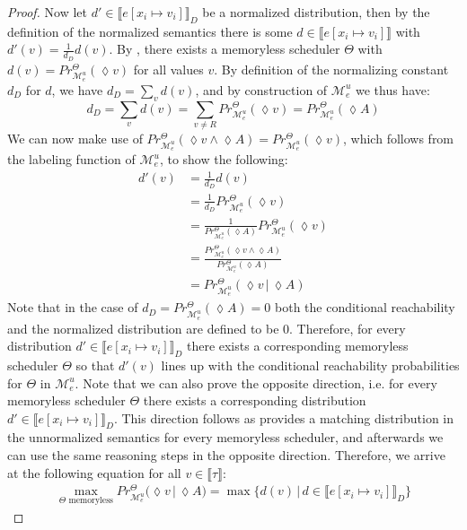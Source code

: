\begin{proof}
	Now let $d' \in \llbracket e[x_i\mapsto v_i] \rrbracket_D$ be a normalized distribution, then by the definition of the normalized semantics there is some $d \in \llbracket e[x_i\mapsto v_i] \rrbracket$ with $d'(v) = \frac{1}{d_D} d(v)$.
	By , there exists a memoryless scheduler $\Theta$ with $d(v) = Pr^\Theta_{\mathcal{M}^u_e}(\lozenge v)$ for all values $v$.
	By definition of the normalizing constant $d_D$ for $d$, we have $d_D = \sum_{v} d(v)$, and by construction of $\mathcal{M}^u_e$ we thus have:
	$$d_D = \sum_{v} d(v) = \sum_{v \neq R} Pr^\Theta_{\mathcal{M}^u_e}(\lozenge v) = Pr^\Theta_{\mathcal{M}^u_e}(\lozenge A)$$
	We can now make use of $Pr^\Theta_{\mathcal{M}^u_e}(\lozenge v \land \lozenge A) = Pr^\Theta_{\mathcal{M}^u_e}(\lozenge v)$, which follows from the labeling function of $\mathcal{M}^u_e$, to show the following:
	\begin{align*}
		d' (v) &= \frac{1}{d_D} d(v)\\ 
		&= \frac{1}{d_D} Pr^\Theta_{\mathcal{M}^u_e}(\lozenge v)\\ 
		&= \frac{1}{Pr^\Theta_{\mathcal{M}^u_e}(\lozenge A)} Pr^\Theta_{\mathcal{M}^u_e}(\lozenge v) \\
		&= \frac{Pr^\Theta_{\mathcal{M}^u_e}(\lozenge v \land \lozenge A) }{Pr^\Theta_{\mathcal{M}^u_e}(\lozenge A)} \\
		&= Pr^\Theta_{\mathcal{M}^u_e}(\lozenge v \,|\, \lozenge A)
	\end{align*}
	Note that in the case of $d_D = Pr^\Theta_{\mathcal{M}^u_e}(\lozenge A) = 0$ both the conditional reachability and the normalized distribution are defined to be $0$.
	Therefore, for every distribution $d' \in \llbracket e[x_i\mapsto v_i] \rrbracket_D$ there exists a corresponding memoryless scheduler $\Theta$ so that $d'(v)$ lines up with the conditional reachability probabilities for $\Theta$ in $\mathcal{M}^u_e$.
	Note that we can also prove the opposite direction, i.e. for every memoryless scheduler $\Theta$ there exists a corresponding distribution $d' \in \llbracket e[x_i\mapsto v_i] \rrbracket_D$.
	This direction follows as  provides a matching distribution in the unnormalized semantics for every memoryless scheduler, and afterwards we can use the same reasoning steps in the opposite direction.
	Therefore, we arrive at the following equation for all $v\in \llbracket \tau \rrbracket$:
	\begin{align*}
		 \max\limits_{\Theta \text{ memoryless}} Pr^{\Theta }_{\mathcal{M}^u_e} (\lozenge v \,|\, \lozenge A) = \max \{d(v) \,|\, d \in \llbracket e[x_i\mapsto v_i]\rrbracket_D\} \tag{I}\label{Equation1}
	\end{align*}
	

\end{proof}
